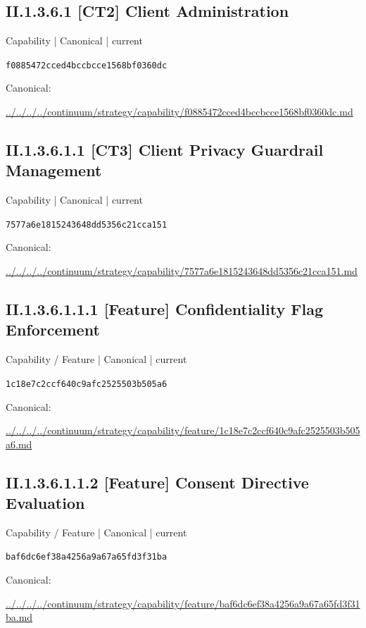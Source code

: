 \documentclass[10pt,a4paper]{article}
\begin{document}
\subsection*{II.1.3.6.1 [CT2] Client Administration}
{\small Capability | Canonical | current}\par
\texttt{f0885472cced4bccbcce1568bf0360dc}\par
Canonical: \par
{\footnotesize\url{../../../../continuum/strategy/capability/f0885472cced4bccbcce1568bf0360dc.md}}\par
\subsection*{II.1.3.6.1.1 [CT3] Client Privacy Guardrail Management}
{\small Capability | Canonical | current}\par
\texttt{7577a6e1815243648dd5356c21cca151}\par
Canonical: \par
{\footnotesize\url{../../../../continuum/strategy/capability/7577a6e1815243648dd5356c21cca151.md}}\par
\subsection*{II.1.3.6.1.1.1 [Feature] Confidentiality Flag Enforcement}
{\small Capability / Feature | Canonical | current}\par
\texttt{1c18e7c2ccf640c9afc2525503b505a6}\par
Canonical: \par
{\footnotesize\url{../../../../continuum/strategy/capability/feature/1c18e7c2ccf640c9afc2525503b505a6.md}}\par
\subsection*{II.1.3.6.1.1.2 [Feature] Consent Directive Evaluation}
{\small Capability / Feature | Canonical | current}\par
\texttt{baf6dc6ef38a4256a9a67a65fd3f31ba}\par
Canonical: \par
{\footnotesize\url{../../../../continuum/strategy/capability/feature/baf6dc6ef38a4256a9a67a65fd3f31ba.md}}\par
\end{document}
